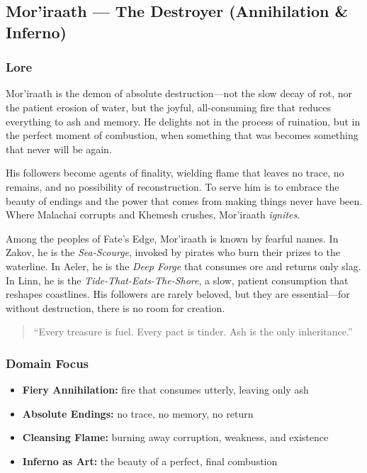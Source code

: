 
\subsection{Mor'iraath --- The Destroyer (Annihilation \& Inferno)}

\subsubsection*{Lore}
Mor'iraath is the demon of absolute destruction---not the slow decay of rot, nor the patient erosion of water, but the joyful, all-consuming fire that reduces everything to ash and memory. He delights not in the process of ruination, but in the perfect moment of combustion, when something that was becomes something that never will be again.

His followers become agents of finality, wielding flame that leaves no trace, no remains, and no possibility of reconstruction. To serve him is to embrace the beauty of endings and the power that comes from making things never have been. Where Malachai corrupts and Khemesh crushes, Mor'iraath \textit{ignites}.

Among the peoples of Fate's Edge, Mor'iraath is known by fearful names. In Zakov, he is the \textit{Sea-Scourge}, invoked by pirates who burn their prizes to the waterline. In Aeler, he is the \textit{Deep Forge} that consumes ore and returns only slag. In Linn, he is the \textit{Tide-That-Eats-The-Shore}, a slow, patient consumption that reshapes coastlines. His followers are rarely beloved, but they are essential---for without destruction, there is no room for creation.

\begin{quote}
``Every treasure is fuel. Every pact is tinder. Ash is the only inheritance.''
\end{quote}

\subsubsection*{Domain Focus}
\begin{itemize}
  \item \textbf{Fiery Annihilation:} fire that consumes utterly, leaving only ash
  \item \textbf{Absolute Endings:} no trace, no memory, no return
  \item \textbf{Cleansing Flame:} burning away corruption, weakness, and existence
  \item \textbf{Inferno as Art:} the beauty of a perfect, final combustion
\end{itemize}

